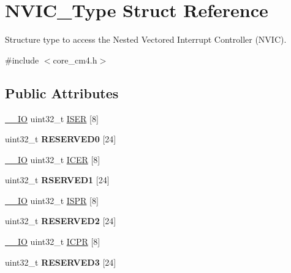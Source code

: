 \hypertarget{struct_n_v_i_c___type}{}\section{N\+V\+I\+C\+\_\+\+Type Struct Reference}
\label{struct_n_v_i_c___type}


Structure type to access the Nested Vectored Interrupt Controller (N\+V\+IC).  




{\ttfamily \#include $<$core\+\_\+cm4.\+h$>$}

\subsection*{Public Attributes}
\begin{DoxyCompactItemize}
\item 
\hyperlink{core__cm4_8h_aec43007d9998a0a0e01faede4133d6be}{\+\_\+\+\_\+\+IO} uint32\+\_\+t \hyperlink{struct_n_v_i_c___type_af90c80b7c2b48e248780b3781e0df80f}{I\+S\+ER} \mbox{[}8\mbox{]}
\item 
uint32\+\_\+t {\bfseries R\+E\+S\+E\+R\+V\+E\+D0} \mbox{[}24\mbox{]}\hypertarget{struct_n_v_i_c___type_a2de17698945ea49abd58a2d45bdc9c80}{}\label{struct_n_v_i_c___type_a2de17698945ea49abd58a2d45bdc9c80}

\item 
\hyperlink{core__cm4_8h_aec43007d9998a0a0e01faede4133d6be}{\+\_\+\+\_\+\+IO} uint32\+\_\+t \hyperlink{struct_n_v_i_c___type_a1965a2e68b61d2e2009621f6949211a5}{I\+C\+ER} \mbox{[}8\mbox{]}
\item 
uint32\+\_\+t {\bfseries R\+S\+E\+R\+V\+E\+D1} \mbox{[}24\mbox{]}\hypertarget{struct_n_v_i_c___type_a6d1daf7ab6f2ba83f57ff67ae6f571fe}{}\label{struct_n_v_i_c___type_a6d1daf7ab6f2ba83f57ff67ae6f571fe}

\item 
\hyperlink{core__cm4_8h_aec43007d9998a0a0e01faede4133d6be}{\+\_\+\+\_\+\+IO} uint32\+\_\+t \hyperlink{struct_n_v_i_c___type_acf8e38fc2e97316242ddeb7ea959ab90}{I\+S\+PR} \mbox{[}8\mbox{]}
\item 
uint32\+\_\+t {\bfseries R\+E\+S\+E\+R\+V\+E\+D2} \mbox{[}24\mbox{]}\hypertarget{struct_n_v_i_c___type_a0953af43af8ec7fd5869a1d826ce5b72}{}\label{struct_n_v_i_c___type_a0953af43af8ec7fd5869a1d826ce5b72}

\item 
\hyperlink{core__cm4_8h_aec43007d9998a0a0e01faede4133d6be}{\+\_\+\+\_\+\+IO} uint32\+\_\+t \hyperlink{struct_n_v_i_c___type_a46241be64208436d35c9a4f8552575c5}{I\+C\+PR} \mbox{[}8\mbox{]}
\item 
uint32\+\_\+t {\bfseries R\+E\+S\+E\+R\+V\+E\+D3} \mbox{[}24\mbox{]}\hypertarget{struct_n_v_i_c___type_a9dd330835dbf21471e7b5be8692d77ab}{}\label{struct_n_v_i_c___type_a9dd330835dbf21471e7b5be8692d77ab}


\end{DoxyCompactItemize}
